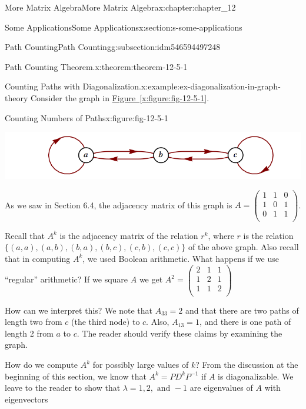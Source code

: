 \documentclass[oneside,10pt,]{book}
\newcommand{\xreffont}{\relax}
\numberwithin{equation}{section}
\begin{document}
\begin{chapterptx}{More Matrix Algebra}{}{More Matrix Algebra}{}{}{x:chapter:chapter_12}
\begin{sectionptx}{Some Applications}{}{Some Applications}{}{}{x:section:s-some-applications}
\begin{subsectionptx}{Path Counting}{}{Path Counting}{}{}{g:subsection:idm546594497248}
\begin{theorem}{Path Counting Theorem.}{}{x:theorem:theorem-12-5-1}
\end{theorem}
\begin{example}{Counting Paths with Diagonalization.}{x:example:ex-diagonalization-in-graph-theory}%
Consider the graph in \hyperref[x:figure:fig-12-5-1]{Figure~{\xreffont\ref{x:figure:fig-12-5-1}}}.%
\begin{figureptx}{Counting Numbers of Paths}{x:figure:fig-12-5-1}{}%
\begin{image}{0.15}{0.7}{0.15}%
\includegraphics[width=\linewidth]{images/fig-12-5-1.png}
\end{image}%
\tcblower
\end{figureptx}%
As we saw in Section 6.4, the adjacency matrix of this graph is \(A=\left(
\begin{array}{ccc}
1 & 1 & 0 \\
1 & 0 & 1 \\
0 & 1 & 1 \\
\end{array}
\right)\).%
\par
Recall that \(A^k\) is the adjacency matrix of the relation \(r^k\), where \(r\) is the relation \(\{(a, a), (a, b), (b, a), (b, c), (c, b), (c, c)\}\) of the above graph. Also recall that in computing \(A^k\), we used Boolean arithmetic. What happens if we use ``regular'' arithmetic?  If we square \(A\) we get \(A^2 = \left(
\begin{array}{ccc}
2 & 1 & 1 \\
1 & 2 & 1 \\
1 & 1 & 2 \\
\end{array}
\right)\)%
\par
How can we interpret this? We note that \(A_{33} = 2\) and that there are two paths of length two from \(c\) (the third node) to \(c\). Also, \(A_{13} = 1\), and there is one path of length 2 from \(a\) to  \(c\). The reader should verify these claims by examining the graph.%
\par
How do we compute \(A^k\) for possibly large values of \(k\)? From the discussion at the beginning of this section, we know that \(A^k= P D^kP^{-1}\) if \(A\) is diagonalizable. We leave to the reader to show that \(\lambda  = 1, 2,\textrm{ and } -1\) are eigenvalues of \(A\) with eigenvectors%
\begin{equation*}

\end{equation*}
\end{example}
\end{subsectionptx}
\end{sectionptx}
\end{chapterptx}
\end{document}

